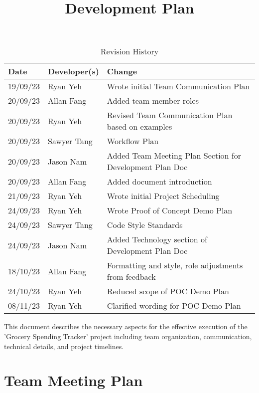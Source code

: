 \documentclass{article}
\title{Development Plan\\\progname}
\author{\authname}
\date{}
\begin{document}
\maketitle

\begin{table}[hp]
\caption{Revision History} \label{TblRevisionHistory}
\begin{tabularx}{\textwidth}{llX}
\toprule
\textbf{Date} & \textbf{Developer(s)} & \textbf{Change}\\
\midrule
19/09/23 & Ryan Yeh & Wrote initial Team Communication Plan\\
20/09/23 & Allan Fang & Added team member roles\\
20/09/23 & Ryan Yeh & Revised Team Communication Plan based on examples\\
20/09/23 & Sawyer Tang & Workflow Plan\\
20/09/23 & Jason Nam & Added Team Meeting Plan Section for Development Plan Doc\\
20/09/23 & Allan Fang & Added document introduction\\
21/09/23 & Ryan Yeh & Wrote initial Project Scheduling\\
24/09/23 & Ryan Yeh & Wrote Proof of Concept Demo Plan\\
24/09/23 & Sawyer Tang & Code Style Standards\\
24/09/23 & Jason Nam & Added Technology section of Development Plan Doc\\
18/10/23 & Allan Fang & Formatting and style, role adjustments from feedback \\
24/10/23 & Ryan Yeh & Reduced scope of POC Demo Plan \\
08/11/23 & Ryan Yeh & Clarified wording for POC Demo Plan \\
\bottomrule
\end{tabularx}
\end{table}

This document describes the necessary aspects for the effective execution of the 'Grocery Spending Tracker' project including team organization, communication, technical details, and project timelines.

\section{Team Meeting Plan}
\end{document}
